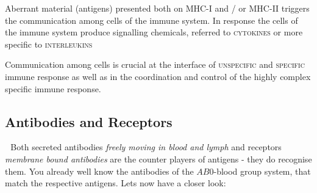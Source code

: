 

\vfill
		\begin{mdframed}[style=exampledefault,leftmargin=2cm userdefinedwidth=14cm,frametitle={MHC-I, MHC-II and Interleukins allow to trigger a immune reaction }\label{mat:BEISPIELMATERIAL}]
			Aberrant material (antigens) presented both on MHC-I and / or MHC-II triggers the communication among cells of the immune system. In response the cells of the immune system produce signalling chemicals, referred to \textsc{cytokines} or more specific to \textsc{interleukins}

			\centering Communication among cells is crucial at the interface of \textsc{unspecific} and \textsc{specific} immune response as well as in the coordination and control of the highly complex specific immune response.
		\end{mdframed}
	\vspace{1cm}



\clearpage \enlargethispage{1.6cm}
\subsection{Antibodies and Receptors}
\Pointinghand\,\, Both secreted antibodies \emph{freely moving in blood and lymph} and receptors \emph{membrane bound antibodies} are the counter players of antigens - they do recognise them. You already well know the antibodies of the $AB0$-blood group system, that match the respective antigens. Lets now have a closer look:


